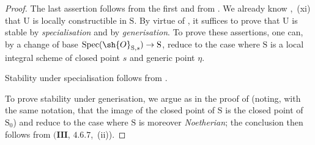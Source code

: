 \begin{proof}
The last assertion follows from the first and from .
We already know ,~(xi) that $\mathrm{U}$ is locally constructible in $\mathrm{S}$.
By virtue of , it suffices to prove that $\mathrm{U}$ is stable by \emph{specialisation} and by \emph{generisation}.
To prove these assertions, one can, by a change of base $\operatorname{Spec}(\sh{O}_{\mathrm{S},s})\to\mathrm{S}$, reduce to the case where $\mathrm{S}$ is a local integral scheme of closed point $s$ and generic point $\eta$.

Stability under specialisation follows from .

To prove stability under generisation, we argue as in the proof of  (noting, with the same notation, that the image of the closed point of $\mathrm{S}$ is the closed point of $\mathrm{S}_0$) and reduce to the case where $\mathrm{S}$ is moreover \emph{Noetherian}; the conclusion then follows from $(\mathbf{III}$, $4.6.7$,~(ii)).
\end{proof}


